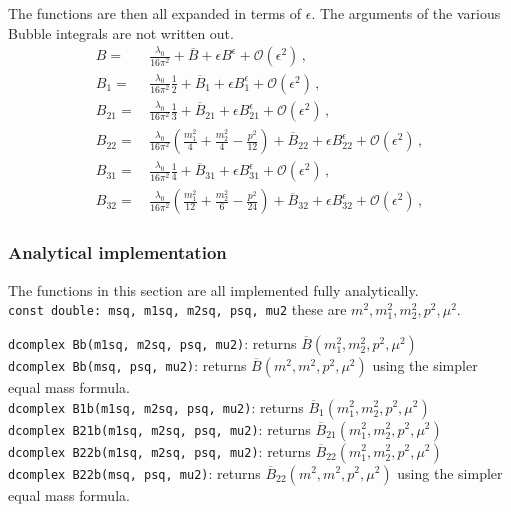 \documentclass[12pt,a4paper]{article}
\newcommand{\mytt}[1]{\texttt{#1}}
\newcommand{\newfunction}[1]{\mytt{#1}\index{\mytt{#1}}}
\begin{document}
The functions are then all expanded in terms of $\epsilon$. The arguments of
the various Bubble integrals are not written out.
\begin{align}
 B = \,&\frac{\lambda_0}{16\pi^2}+\overline B +\epsilon B^\epsilon
 +\mathcal{O}(\epsilon^2)\,,
\nonumber\\
 B_1 = \,&\frac{\lambda_0}{16\pi^2}\frac{1}{2}+\overline B_1 
+\epsilon B_1^\epsilon +\mathcal{O}(\epsilon^2)\,,
\nonumber\\
 B_{21} = \,&\frac{\lambda_0}{16\pi^2}\frac{1}{3}+\overline B_{21} 
+\epsilon B_{21}^\epsilon +\mathcal{O}(\epsilon^2)\,,
\nonumber\\
 B_{22} = \,&\frac{\lambda_0}{16\pi^2}
\left(\frac{m_1^2}{4}+\frac{m_2^2}{4}-\frac{p^2}{12}\right)+\overline B_{22} 
+\epsilon B_{22}^\epsilon +\mathcal{O}(\epsilon^2)\,,
\nonumber\\
 B_{31} = \,&\frac{\lambda_0}{16\pi^2}\frac{1}{4}+\overline B_{31} 
+\epsilon B_{31}^\epsilon +\mathcal{O}(\epsilon^2)\,,
\nonumber\\
 B_{32} = \,&\frac{\lambda_0}{16\pi^2}
\left(\frac{m_1^2}{12}+\frac{m_2^2}{6}-\frac{p^2}{24}\right)+\overline B_{32} 
+\epsilon B_{32}^\epsilon +\mathcal{O}(\epsilon^2)\,,
\end{align}

\subsubsection{Analytical implementation}

The functions in this section are all implemented fully analytically.\\

\mytt{const double: msq, m1sq, m2sq, psq, mu2}
these are $m^2,m_1^2,m_2^2,p^2,\mu^2$.

\mytt{dcomplex \newfunction{Bb}(m1sq, m2sq, psq, mu2)}:
returns $\overline B(m_1^2,m_2^2,p^2,\mu^2)$\\
\mytt{dcomplex \newfunction{Bb}(msq, psq, mu2)}:
returns $\overline B(m^2,m^2,p^2,\mu^2)$ using the simpler equal mass formula.\\
\mytt{dcomplex \newfunction{B1b}(m1sq, m2sq, psq, mu2)}:
returns $\overline B_1(m_1^2,m_2^2,p^2,\mu^2)$\\
\mytt{dcomplex \newfunction{B21b}(m1sq, m2sq, psq, mu2)}:
returns $\overline B_{21}(m_1^2,m_2^2,p^2,\mu^2)$\\
\mytt{dcomplex \newfunction{B22b}(m1sq, m2sq, psq, mu2)}:
returns $\overline B_{22}(m_1^2,m_2^2,p^2,\mu^2)$\\
\mytt{dcomplex \newfunction{B22b}(msq, psq, mu2)}:
returns $\overline B_{22}(m^2,m^2,p^2,\mu^2)$ using the simpler equal mass formula.\\
\end{document}
